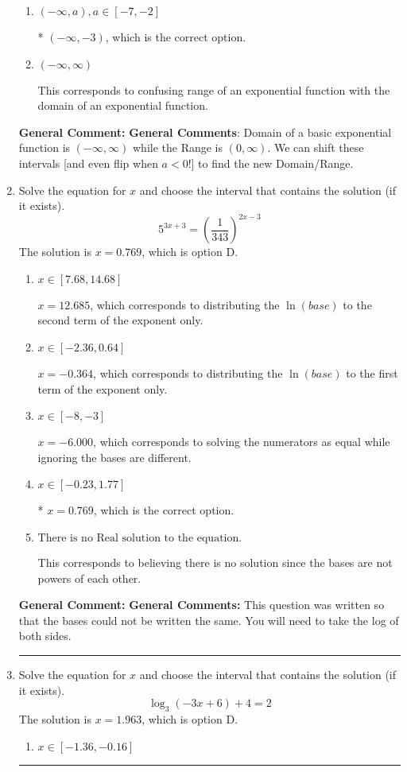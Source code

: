 \documentclass{extbook}[14pt]
\newcommand{\litem}[1]{\item #1

\rule{\textwidth}{0.4pt}}
\begin{document}
\begin{enumerate}
{\begin{enumerate}[label=\Alph*.]
$[3, \infty)$, which corresponds to using the negative vertical shift AND flipping the Range interval AND including the endpoint.
\item \( (-\infty, a), a \in [-7, -2] \)

* $(-\infty, -3)$, which is the correct option.
\item \( (-\infty, \infty) \)

This corresponds to confusing range of an exponential function with the domain of an exponential function.
\end{enumerate}

\textbf{General Comment:} \textbf{General Comments}: Domain of a basic exponential function is $(-\infty, \infty)$ while the Range is $(0, \infty)$. We can shift these intervals [and even flip when $a<0$!] to find the new Domain/Range.
}
\litem{
Solve the equation for $x$ and choose the interval that contains the solution (if it exists).
\[ 5^{3x+3} = \left(\frac{1}{343}\right)^{2x-3} \]The solution is \( x = 0.769 \), which is option D.\begin{enumerate}[label=\Alph*.]
\item \( x \in [7.68, 14.68] \)

$x = 12.685$, which corresponds to distributing the $\ln(base)$ to the second term of the exponent only.
\item \( x \in [-2.36, 0.64] \)

$x = -0.364$, which corresponds to distributing the $\ln(base)$ to the first term of the exponent only.
\item \( x \in [-8, -3] \)

$x = -6.000$, which corresponds to solving the numerators as equal while ignoring the bases are different.
\item \( x \in [-0.23, 1.77] \)

* $x = 0.769$, which is the correct option.
\item \( \text{There is no Real solution to the equation.} \)

This corresponds to believing there is no solution since the bases are not powers of each other.
\end{enumerate}

\textbf{General Comment:} \textbf{General Comments:} This question was written so that the bases could not be written the same. You will need to take the log of both sides.
}
\litem{
Solve the equation for $x$ and choose the interval that contains the solution (if it exists).
\[ \log_{3}{(-3x+6)}+4 = 2 \]The solution is \( x = 1.963 \), which is option D.\begin{enumerate}[label=\Alph*.]
\item \( x \in [-1.36, -0.16] \)


\end{enumerate}}
\end{enumerate}
\end{document}
